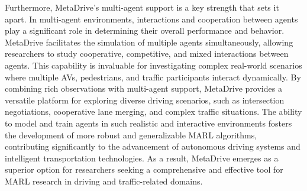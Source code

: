 Furthermore, MetaDrive's multi-agent support is a key strength that sets it apart. In multi-agent environments, interactions and cooperation between agents play a significant role in determining their overall performance and behavior. MetaDrive facilitates the simulation of multiple agents simultaneously, allowing researchers to study cooperative, competitive, and mixed interactions between agents. This capability is invaluable for investigating complex real-world scenarios where multiple AVs, pedestrians, and traffic participants interact dynamically.
By combining rich observations with multi-agent support, MetaDrive provides a versatile platform for exploring diverse driving scenarios, such as intersection negotiations, cooperative lane merging, and complex traffic situations. The ability to model and train agents in such realistic and interactive environments fosters the development of more robust and generalizable MARL algorithms, contributing significantly to the advancement of autonomous driving systems and intelligent transportation technologies. As a result, MetaDrive emerges as a superior option for researchers seeking a comprehensive and effective tool for MARL research in driving and traffic-related domains.





